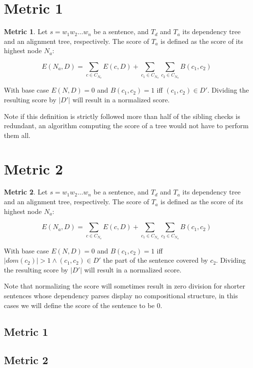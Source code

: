 \documentclass[a4paper, 11pt]{report}
\theoremstyle{definition}
\newtheorem{metric}{Metric}
\theoremstyle{plain}
\begin{document}
\section{Metric 1}

\begin{metric}\label{m1}
Let $s = w_1 w_2 \dots w_n$ be a sentence, and $T_d$ and $T_a$ its dependency tree and an alignment tree, respectively. The score of $T_a$ is defined as the score of its highest node $N_{a}$:

$$
E(N_a,D) = \sum_{c\in C_{N_a}} E(c,D)+ \sum_{c_1\in C_{N_a}} \sum_{c_2\in C_{N_a}} B(c_1,c_2)
$$

\noindent With base case $E(N,D) = 0$ and $B(c_1,c_2) = 1$ iff  $(c_1,c_2)\in D'$. Dividing the resulting score by $|D'|$ will result in a normalized score.
\end{metric}

\noindent  Note if this definition is strictly followed more than half of the sibling checks is redundant, an algorithm computing the score of a tree would not have to perform them all.

\section{Metric 2}

\begin{metric}\label{m2}
Let $s = w_1 w_2 \dots w_n$ be a sentence, and $T_d$ and $T_a$ its dependency tree and an alignment tree, respectively. The score of $T_a$ is defined as the score of its highest node $N_{a}$:

$$
E(N_a,D) = \sum_{c\in C_{N_a}} E(c,D)+ \sum_{c_1\in C_{N_a}} \sum_{c_2\in C_{N_a}} B(c_1,c_2)
$$

\noindent With base case $E(N,D) = 0$ and $B(c_1,c_2) = 1$ iff  $|dom(c_2)| > 1 \land (c_1,c_2)\in D'$ the part of the sentence covered by $c_2$. Dividing the resulting score by $|D'|$ will result in a normalized score.
\end{metric}

Note that normalizing the score will sometimes result in zero division for shorter sentences whose dependency parses display no compositional structure, in this cases we will define the score of the sentence to be 0.


\subsection{Metric 1}


\subsection{Metric 2}
\end{document}

